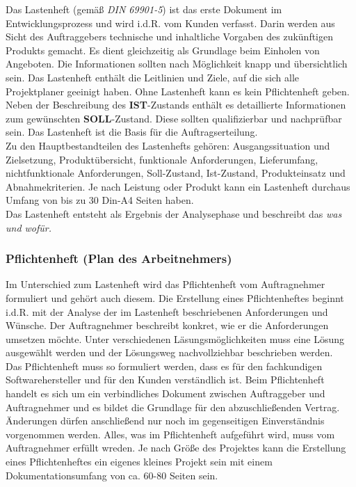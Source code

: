 \documentclass[a4paper, 12pt]{report}
\begin{document}
Das Lastenheft (gemäß \emph{DIN 69901-5}) ist das erste Dokument im
Entwicklungsprozess und wird i.d.R. vom Kunden verfasst. Darin werden aus Sicht
des Auftraggebers technische und inhaltliche Vorgaben des zukünftigen Produkts
gemacht. Es dient gleichzeitig als Grundlage beim Einholen von Angeboten. Die
Informationen sollten nach Möglichkeit knapp und übersichtlich sein. Das
Lastenheft enthält die Leitlinien und Ziele, auf die sich alle Projektplaner
geeinigt haben. Ohne Lastenheft kann es kein Pflichtenheft geben. Neben der
Beschreibung des \textbf{IST}-Zustands enthält es detaillierte Informationen zum
gewünschten \textbf{SOLL}-Zustand. Diese sollten qualifizierbar und nachprüfbar
sein. Das Lastenheft ist die Basis für die Auftragserteilung. \\

Zu den Hauptbestandteilen des Lastenhefts gehören: Ausgangssituation und
Zielsetzung, Produktübersicht, funktionale Anforderungen, Lieferumfang,
nichtfunktionale Anforderungen, Soll-Zustand, Ist-Zustand, Produkteinsatz und
Abnahmekriterien. Je nach Leistung oder Produkt kann ein Lastenheft durchaus
Umfang von bis zu 30 Din-A4 Seiten haben. \\

Das Lastenheft entsteht als Ergebnis der Analysephase und beschreibt das \emph{
was und wofür.}

\subsubsection{Pflichtenheft (Plan des Arbeitnehmers)}

Im Unterschied zum Lastenheft wird das Pflichtenheft vom Auftragnehmer
formuliert und gehört auch diesem. Die Erstellung eines Pflichtenheftes beginnt
i.d.R. mit der Analyse der im Lastenheft beschriebenen Anforderungen und
Wünsche. Der Auftragnehmer beschreibt konkret, wie er die Anforderungen umsetzen
möchte. Unter verschiedenen Läsungsmöglichkeiten muss eine Lösung ausgewählt
werden und der Lösungsweg nachvollziehbar beschrieben werden. \\

Das Pflichtenheft muss so formuliert werden, dass es für den fachkundigen
Softwarehersteller und für den Kunden verständlich ist. Beim Pflichtenheft
handelt es sich um ein verbindliches Dokument zwischen Auftraggeber und
Auftragnehmer und es bildet die Grundlage für den abzuschließenden Vertrag.
Änderungen dürfen anschließend nur noch im gegenseitigen Einverständnis
vorgenommen werden. Alles, was im Pflichtenheft aufgeführt wird, muss vom
Auftragnehmer erfüllt wreden. Je nach Größe des Projektes kann die Erstellung
eines Pflichtenheftes ein eigenes kleines Projekt sein mit einem
Dokumentationsumfang von ca. 60-80 Seiten sein. \\
\end{document}
